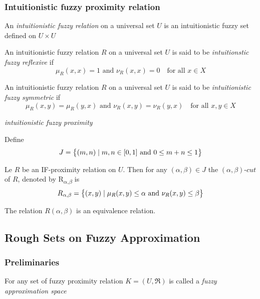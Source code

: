 \documentclass[11pt]{article}
\begin{document}
\subsubsection{Intuitionistic fuzzy proximity relation}
\label{sec:org09e52d6}
\begin{definition}[]
An \emph{intuitionistic fuzzy relation} on a universal set \(U\) is an intuitionistic
fuzzy set defined on \(U\times U\)
\end{definition}
\begin{definition}[]
An intuitionistic fuzzy relation \(R\) on a universal set \(U\) is said to be 
\emph{intuitionstic fuzzy reflexive} if 
\begin{equation*}
\mu_R(x,x)=1\text{ and } \nu_R(x,x)=0\quad\text{for all } x\in X
\end{equation*}
\end{definition}
\begin{definition}[]
An intuitionistic fuzzy relation \(R\) on a universal set \(U\) is said to be 
\emph{intuitionistic fuzzy symmetric} if
\begin{equation*}
\mu_R(x,y)=\mu_R(y,x)\text{ and } \nu_R(x,y)=\nu_R(y,x)\quad\text{for all } x,y\in X
\end{equation*}
\end{definition}
\begin{definition}[]
\emph{intuitionistic fuzzy proximity}
\end{definition}
Define
\begin{equation*}
J=\left\{(m,n)\mid m,n\in[0,1] \text{ and } 0\le m+n\le 1\right\}
\end{equation*}
\begin{definition}[]
Le \(R\) be an IF-proximity relation on \(U\). Then for any \((\alpha,\beta)\in J\) the 
\((\alpha,\beta)\textit{-cut}\) of \(R\), denoted by R\textsubscript{\(\alpha\),\(\beta\)} is 
\begin{equation*}
R_{\alpha,\beta}=\left\{(x,y)\mid\mu_R(x,y)\le\alpha\text{ and } \nu_R(x,y)\le\beta\right\}
\end{equation*}
\end{definition}
The relation \(R(\alpha,\beta)\) is an equivalence relation.
\subsection{Rough Sets on Fuzzy Approximation}
\label{sec:org6636b93}
\subsubsection{Preliminaries}
\label{sec:org05193a7}
\begin{definition}[]
For any set of fuzzy proximity relation \(K=(U,\mathfrak{R})\) is called a
\emph{fuzzy approximation space}
\end{definition}
\end{document}
